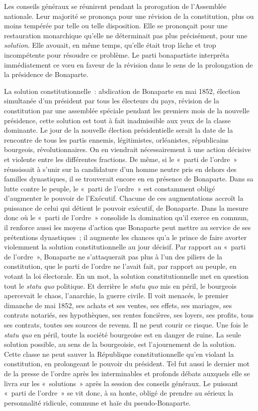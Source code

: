 \documentclass[french,twoside]{book} %
\begin{document}
Les conseils généraux se réunirent pendant la prorogation de l’Assemblée nationale. Leur majorité se prononça pour une révision de la constitution, plus ou moins tempérée par telle ou telle disposition. Elle se prononçait pour une restauration monarchique qu’elle ne déterminait pas plus précisément, pour une \emph{solution}. Elle avouait, en même temps, qu’elle était trop lâche et trop incompétente pour résoudre ce problème. Le parti bonapartiste interpréta immédiatement ce vœu en faveur de la révision dans le sens de la prolongation de la présidence de Bonaparte.\par
La solution constitutionnelle : abdication de Bonaparte en mai 1852, élection simultanée d’un président par tous les électeurs du pays, révision de la constitution par une assemblée spéciale pendant les premiers mois de la nouvelle présidence, cette solution est tout à fait inadmissible aux yeux de la classe dominante. Le jour de la nouvelle élection présidentielle serait la date de la rencontre de tous les partis ennemis, légitimistes, orléanistes, républicains bourgeois, révolutionnaires. On en viendrait nécessairement à une action décisive et violente entre les différentes fractions. De même, si le « parti de l’ordre » réussissait à s’unir sur la candidature d’un homme neutre pris en dehors des familles dynastiques, il se trouverait encore en en présence de Bonaparte. Dans sa lutte contre le peuple, le « parti de l’ordre » est constamment obligé d’augmenter le pouvoir de l’Exécutif. Chacune de ces augmentations accroît la puissance de celui qui détient le pouvoir exécutif, de Bonaparte. Dans la mesure donc où le « parti de l’ordre » consolide la domination qu’il exerce en commun, il renforce aussi les moyens d’action que Bonaparte peut mettre au service de ses prétentions dynastiques ; il augmente les chances qu’a le prince de faire avorter violemment la solution constitutionnelle au jour décisif. Par rapport au « parti de l’ordre », Bonaparte ne s’attaquerait pas plus à l’un des piliers de la constitution, que le parti de l’ordre ne l’avait fait, par rapport au peuple, en votant la loi électorale. En un mot, la solution constitutionnelle met en question tout le \emph{statu quo} politique. Et derrière le \emph{statu quo} mis en péril, le bourgeois apercevait le chaos, l’anarchie, la guerre civile. Il voit menacés, le premier dimanche de mai 1852, ses achats et ses ventes, ses effets, ses mariages, ses contrats notariés, ses hypothèques, ses rentes foncières, ses loyers, ses profits, tous ses contrats, toutes ses sources de revenu. Il ne peut courir ce risque. Une fois le \emph{statu quo} en péril, toute la société bourgeoise est en danger de ruine. La seule solution possible, au sens de la bourgeoisie, est l’ajournement de la solution. Cette classe ne peut sauver la République constitutionnelle qu’en violant la constitution, en prolongeant le pouvoir du président. Tel fut aussi le dernier mot de la presse de l’ordre après les interminables et profonds débats auxquels elle se livra sur les « solutions » après la session des conseils généraux. Le puissant « parti de l’ordre » se vit donc, à sa honte, obligé de prendre au sérieux la personnalité ridicule, commune et haïe du pseudo-Bonaparte.\par
\end{document}
